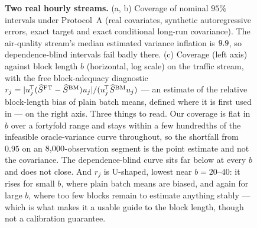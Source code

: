 \begin{figure}[tbp]
\centering
{}
\caption{\textbf{Two real hourly streams.} (a, b) Coverage of nominal $95\%$ intervals
under Protocol~A (real covariates, synthetic autoregressive errors, exact target and exact
conditional long-run covariance). The air-quality stream's median estimated variance inflation
is $9.9$, so dependence-blind intervals fail badly there.
(c) Coverage (left axis) against block length $b$ (horizontal, log scale) on the traffic stream,
with the free block-adequacy diagnostic
$r_j=|u_j^{\!\top}(\widehat{S}^{\mathrm{FT}}-\widehat{S}^{\mathrm{BM}})u_j|/(u_j^{\!\top}\widehat{S}^{\mathrm{BM}} u_j)$ --- an estimate of the relative
block-length bias of plain batch means, defined where it is first used in  --- on the
right axis. Three things to read. Our coverage is flat in $b$ over a fortyfold range and stays
within a few hundredths of the infeasible oracle-variance curve throughout, so the shortfall from
$0.95$ on an $8{,}000$-observation segment is the point estimate and not the covariance. The
dependence-blind curve sits far below at every $b$ and does not close. And $r_j$ is U-shaped, lowest
near $b=20$--$40$: it rises for small $b$, where plain batch means are biased, and again for large
$b$, where too few blocks remain to estimate anything stably --- which is what makes it a usable
guide to the block length, though not a calibration guarantee.}
\label{fig:real}
\end{figure}

